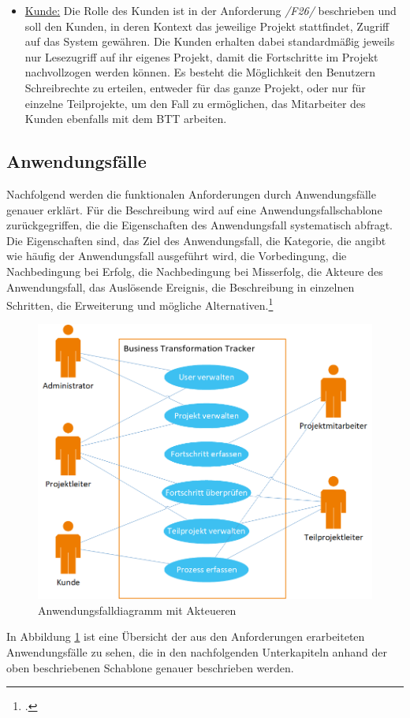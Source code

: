 \begin{itemize}
    \item[] \underline{Kunde:} Die Rolle des Kunden ist in der Anforderung \emph{/F26/} beschrieben und soll den Kunden, in deren Kontext das jeweilige Projekt stattfindet, Zugriff auf das System gewähren. Die Kunden erhalten dabei standardmäßig jeweils nur Lesezugriff auf ihr eigenes Projekt, damit die Fortschritte im Projekt nachvollzogen werden können. Es besteht die Möglichkeit den Benutzern Schreibrechte zu erteilen, entweder für das ganze Projekt, oder nur für einzelne Teilprojekte, um den Fall zu ermöglichen, das Mitarbeiter des Kunden ebenfalls mit dem BTT arbeiten.  

\end{itemize}

\subsection{Anwendungsfälle}
Nachfolgend werden die funktionalen Anforderungen durch Anwendungsfälle genauer erklärt. Für die Beschreibung wird auf eine Anwendungsfallschablone zurückgegriffen, die die Eigenschaften des Anwendungsfall systematisch abfragt. Die Eigenschaften sind, das Ziel des Anwendungsfall, die Kategorie, die angibt wie häufig der Anwendungsfall ausgeführt wird, die Vorbedingung, die Nachbedingung bei Erfolg, die Nachbedingung bei Misserfolg, die Akteure des Anwendungsfall, das Auslösende Ereignis, die Beschreibung in einzelnen Schritten, die Erweiterung und mögliche Alternativen.\footcite[Vgl.][S. 261]{balzert}
\begin{figure}[h]
    \centering
    \includegraphics[scale=0.67]{./Bilder/Anwendungsfalldiagramm.png}
    \caption[Anwendungsfalldiagramm]{Anwendungsfalldiagramm mit Akteueren}
    \label{fig:Anwendungsfalldiagramm}
\end{figure}
In Abbildung \ref{fig:Anwendungsfalldiagramm} ist eine Übersicht der aus den Anforderungen erarbeiteten Anwendungsfälle zu sehen, die in den nachfolgenden Unterkapiteln anhand der oben beschriebenen Schablone genauer beschrieben werden.

